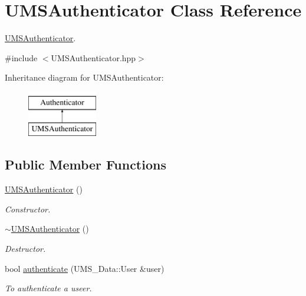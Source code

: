 \hypertarget{classUMSAuthenticator}{
\section{UMSAuthenticator Class Reference}
\label{classUMSAuthenticator}
}


\hyperlink{classUMSAuthenticator}{UMSAuthenticator}.  




{\ttfamily \#include $<$UMSAuthenticator.hpp$>$}

Inheritance diagram for UMSAuthenticator:\begin{figure}[H]
\begin{center}
\leavevmode
\includegraphics[height=2.000000cm]{classUMSAuthenticator}
\end{center}
\end{figure}
\subsection*{Public Member Functions}
\begin{DoxyCompactItemize}
\item 
\hypertarget{classUMSAuthenticator_aa036a782fb47d689337c9e509acfce3a}{
\hyperlink{classUMSAuthenticator_aa036a782fb47d689337c9e509acfce3a}{UMSAuthenticator} ()}
\label{classUMSAuthenticator_aa036a782fb47d689337c9e509acfce3a}

\begin{DoxyCompactList}\small\item\em Constructor. \item\end{DoxyCompactList}\item 
\hypertarget{classUMSAuthenticator_a163affd5ca8f7825d55527dd45b0b7a2}{
\hyperlink{classUMSAuthenticator_a163affd5ca8f7825d55527dd45b0b7a2}{$\sim$UMSAuthenticator} ()}
\label{classUMSAuthenticator_a163affd5ca8f7825d55527dd45b0b7a2}

\begin{DoxyCompactList}\small\item\em Destructor. \item\end{DoxyCompactList}\item 
bool \hyperlink{classUMSAuthenticator_aaa2932b46e0c6ebeee5a842d86847f74}{authenticate} (UMS\_\-Data::User \&user)
\begin{DoxyCompactList}\small\item\em To authenticate a useer. \item\end{DoxyCompactList}\end{DoxyCompactItemize}


